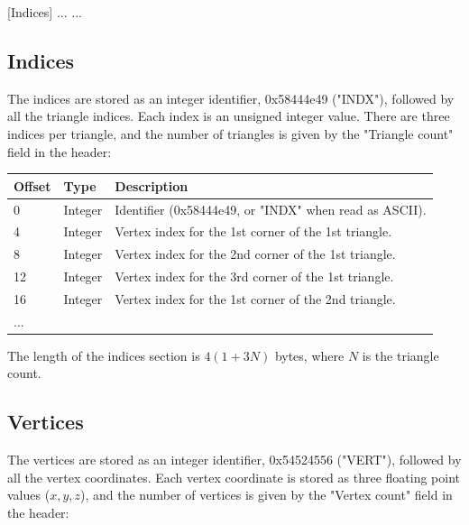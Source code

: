 [Indices]\newline
[Vertices]\newline
[Normals]\newline
[UV Map 0]\newline
[UV Map 1]\newline
...\newline
[UV Map N]\newline
...

\subsection{Indices}
The indices are stored as an integer identifier, 0x58444e49 ("INDX"), followed
by all the triangle indices. Each index is an unsigned integer value. There are
three indices per triangle, and the number of triangles is given by the
"Triangle count" field in the header:

\begin{tabular}{|l|l|l|}\hline
\textbf{Offset} &  \textbf{Type} & \textbf{Description}\\ \hline
0 & Integer & Identifier (0x58444e49, or "INDX" when read as ASCII).\\ \hline
4 & Integer & Vertex index for the 1st corner of the 1st triangle.\\ \hline
8 & Integer & Vertex index for the 2nd corner of the 1st triangle.\\ \hline
12 & Integer & Vertex index for the 3rd corner of the 1st triangle.\\ \hline
16 & Integer & Vertex index for the 1st corner of the 2nd triangle.\\ \hline
... & & \\ \hline
\end{tabular}

The length of the indices section is $4(1+3N)$ bytes, where $N$ is the triangle
count.

\subsection{Vertices}
The vertices are stored as an integer identifier, 0x54524556 ("VERT"), followed
by all the vertex coordinates. Each vertex coordinate is stored as three
floating point values ($x,y,z$), and the number of vertices is given by the
"Vertex count" field in the header:

